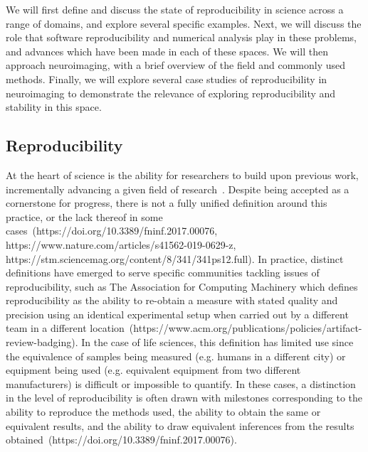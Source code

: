 We will first define and discuss the state of reproducibility in science across a range of domains, and explore several
specific examples. Next, we will discuss the role that software reproducibility and numerical analysis play in these
problems, and advances which have been made in each of these spaces. We will then approach neuroimaging, with a brief
overview of the field and commonly used methods. Finally, we will explore several case studies of reproducibility in
neuroimaging to demonstrate the relevance of exploring reproducibility and stability in this space.

\subsection{Reproducibility}
At the heart of science is the ability for researchers to build upon previous work, incrementally advancing a given
field of research~\tocite {}. Despite being accepted as a cornerstone for progress, there is not a fully unified definition around
this practice, or the lack thereof in some cases~\tocite (https://doi.org/10.3389/fninf.2017.00076, https://www.nature.com/articles/s41562-019-0629-z, https://stm.sciencemag.org/content/8/341/341ps12.full).
In practice, distinct definitions have emerged to serve specific communities tackling issues of reproducibility, such
as The Association for Computing Machinery which defines reproducibility as the ability to re-obtain a measure with
stated quality and precision using an identical experimental setup when carried out by a different team in a different
location~\tocite(https://www.acm.org/publications/policies/artifact-review-badging). In the case of life sciences,
this definition has limited use since the equivalence of samples being measured (e.g. humans in a different city) or
equipment being used (e.g. equivalent equipment from two different manufacturers) is difficult or impossible to
quantify. In these cases, a distinction in the level of reproducibility is often drawn with milestones corresponding to
the ability to reproduce the methods used, the ability to obtain the same or equivalent results, and the ability to
draw equivalent inferences from the results obtained~\tocite (https://doi.org/10.3389/fninf.2017.00076).

